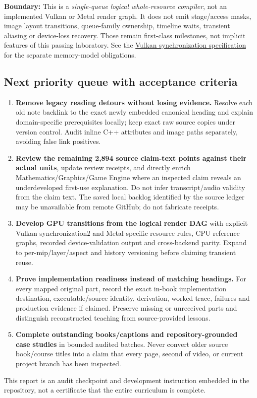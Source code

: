 \textbf{Boundary:} This is a \emph{single-queue logical whole-resource compiler}, not an implemented Vulkan or Metal render graph. It does not emit stage/access masks, image layout transitions, queue-family ownership, timeline waits, transient aliasing or device-loss recovery. Those remain first-class milestones, not implicit features of this passing laboratory. See the \href{https://docs.vulkan.org/spec/latest/chapters/synchronization.html}{Vulkan synchronization specification} for the separate memory-model obligations.

\subsection{Next priority queue with acceptance criteria}\label{next-priority-queue-with-acceptance-criteria}

\begin{enumerate}
\def\labelenumi{\arabic{enumi}.}
\tightlist
\item
  \textbf{Remove legacy reading detours without losing evidence.} Resolve each old note backlink to the exact newly embedded canonical heading and explain domain-specific prerequisites locally; keep exact raw source copies under version control. Audit inline C++ attributes and image paths separately, avoiding false link positives.
\item
  \textbf{Review the remaining 2,894 source claim-text points against their actual units}, update review receipts, and directly enrich Mathematics/Graphics/Game Engine where an inspected claim reveals an underdeveloped first-use explanation. Do not infer transcript/audio validity from the claim text. The saved local backlog identified by the source ledger may be unavailable from remote GitHub; do not fabricate receipts.
\item
  \textbf{Develop GPU transitions from the logical render DAG} with explicit Vulkan synchronization2 and Metal-specific resource rules, CPU reference graphs, recorded device-validation output and cross-backend parity. Expand to per-mip/layer/aspect and history versioning before claiming transient reuse.
\item
  \textbf{Prove implementation readiness instead of matching headings.} For every mapped original part, record the exact in-book implementation destination, executable/source identity, derivation, worked trace, failures and production evidence if claimed. Preserve missing or unreceived parts and distinguish reconstructed teaching from source-provided lessons.
\item
  \textbf{Complete outstanding books/captions and repository-grounded case studies} in bounded audited batches. Never convert older source book/course titles into a claim that every page, second of video, or current project branch has been inspected.
\end{enumerate}

This report is an audit checkpoint and development instruction embedded in the repository, not a certificate that the entire curriculum is complete.
